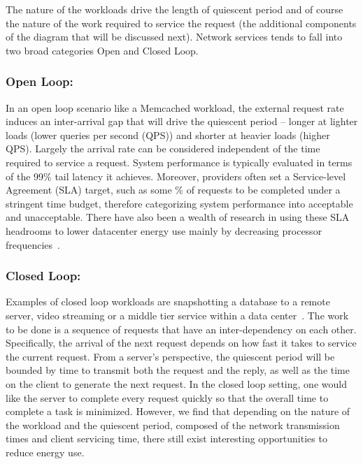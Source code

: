 The nature of the workloads drive the length of quiescent period and of course the nature of the work required to service the request (the additional components of the diagram that will be discussed next).  Network services tends to fall into two broad categories Open and Closed Loop.   

\subsubsection{Open Loop:}
\label{sec:workflow:openloop}
In an open loop scenario like a Memcached workload, the external request rate induces an inter-arrival gap that will drive the quiescent period -- longer at lighter loads (lower queries per second (QPS)) and shorter at heavier loads (higher QPS). Largely the arrival rate can be considered independent of the time required to service a request.  System performance is typically evaluated in terms of the 99\% tail latency it achieves.  Moreover, providers often set a Service-level Agreement (SLA) target, such as some \% of requests to be completed under a stringent time budget, therefore categorizing system performance into acceptable and unacceptable. There have also been a wealth of research in using these SLA headrooms to lower datacenter energy use mainly by decreasing processor frequencies~\cite{Dynamo, SmoothOperator, oldi-pegasus, adrenaline, heracles, energyproportion, warehouse-power}.


\subsubsection{Closed Loop:}
\label{sec:workflow:closed_loop}
Examples of closed loop workloads are snapshotting a database to a remote server, video streaming or a middle tier service within a data center~\cite{Barroso:2009:DCI:1643608, oldi-study, oldi-pegasus, warehouse-power, energyproportion, WebSearch}.  The work to be done is a sequence of requests that have an inter-dependency on each other. Specifically, the arrival of the next request depends on how fast it takes to service the current request. From a server's perspective, the quiescent period will be bounded by time to transmit both the request and the reply, as well as the time on the client to generate the next request.  
In the closed loop setting, one would like the server to complete every request quickly so that the overall time to complete a task is minimized. However, we find that depending on the nature of the workload and the quiescent period, composed of the network transmission times and client servicing time, there still exist interesting opportunities to reduce energy use.

